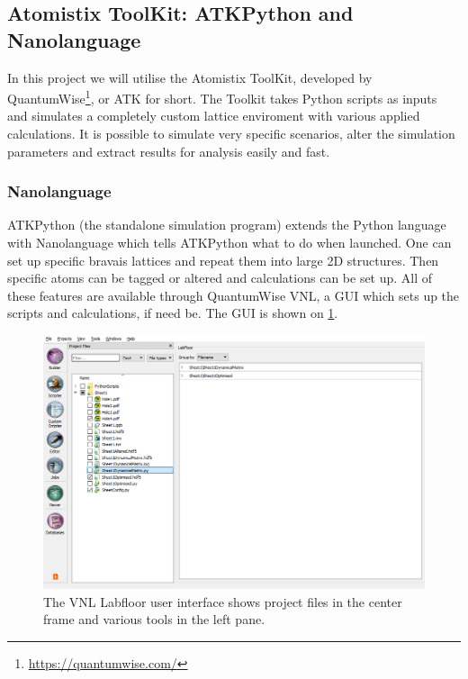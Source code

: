 
\subsection{Atomistix ToolKit: ATKPython and Nanolanguage}
In this project we will utilise the Atomistix ToolKit, developed by QuantumWise\footnote{\url{https://quantumwise.com/}}, or ATK for short. The Toolkit takes Python scripts as inputs and simulates a completely custom lattice enviroment with various applied calculations. It is possible to simulate very specific scenarios, alter the simulation parameters and extract results for analysis easily and fast.
\subsubsection{Nanolanguage}
ATKPython (the standalone simulation program) extends the Python language with Nanolanguage which tells ATKPython what to do when launched. One can set up specific bravais lattices and repeat them into large 2D structures. Then specific atoms can be tagged or altered and calculations can be set up. All of these features are available through QuantumWise VNL, a GUI which sets up the scripts and calculations, if need be. The GUI is shown on \cref{VNLLAB}.
\begin{figure}
 \centering
 \includegraphics[width=\columnwidth]{Figures/VNLLabfloor.png}
 \caption{The VNL Labfloor user interface shows project files in the center frame and various tools in the left pane.}
 \label{VNLLAB}
\end{figure}
